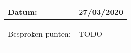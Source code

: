 \begin{tabularx}{\textwidth}{| l | X |}
    \hline
    Datum: & 27/03/2020\\
    \hline
    Besproken punten: &
    \begin{compactitem}
      \item TODO
    \end{compactitem}\\
    \hline
  \end{tabularx}